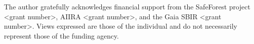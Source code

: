 
\setlength{\parskip}{1em}
\setlength{\parindent}{0em}
The author gratefully acknowledges financial support from the SafeForest project <grant number>, AIIRA <grant number>, and the Gaia SBIR <grant number>. Views expressed are those of the individual and do not necessarily represent those of the funding agency.
